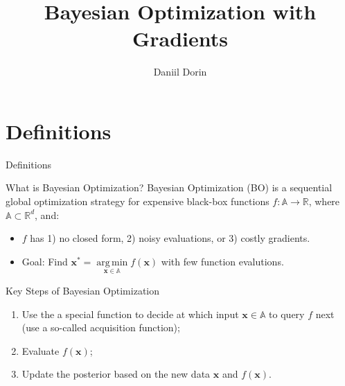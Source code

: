 \documentclass{beamer}
\title[Bayesian Optimization]{Bayesian Optimization with Gradients}
\author{Daniil Dorin}
\institute{MIPT, 2025}
\DeclareMathOperator*{\argmin}{arg\,min}
\begin{document}
\begin{frame}
    \titlepage
\end{frame}


\begin{frame}
    \tableofcontents
\end{frame}


\section{Definitions}
\begin{frame}{Definitions}
    \begin{block}{What is Bayesian Optimization?}
        Bayesian Optimization (BO) is a \alert{sequential} global optimization strategy for expensive \alert{black-box} functions $f: \mathbb{A} \to \mathbb{R}$, where $\mathbb{A} \subset \mathbb{R}^{d}$, and:
        \begin{itemize}
            \item $f$ has 1) no closed form, 2) noisy evaluations, or 3) costly gradients.
            \item Goal: Find $\mathbf{x}^* = \argmin\limits_{\mathbf{x} \in \mathbb{A}} f(\mathbf{x})$ with few function evalutions.
        \end{itemize}            
    \end{block}
    \begin{block}{Key Steps of Bayesian Optimization}
            \begin{enumerate}
                \item Use the a special function to decide at which input $\mathbf{x} \in \mathbb{A}$ to query $f$ next (use a so-called \alert{acquisition function});
                \item Evaluate $f(\mathbf{x})$;
                \item \alert{Update the posterior} based on the new data $\mathbf{x}$ and $f(\mathbf{x})$.
            \end{enumerate}
\end{block}

\end{frame}
\end{document}
